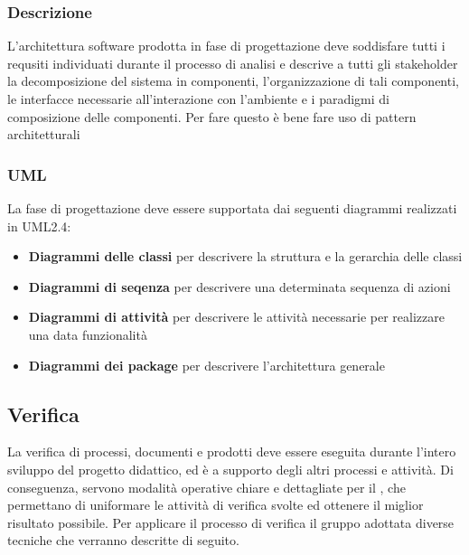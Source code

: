 \documentclass[12pt,a4paper]{article}
\begin{document}
\subsubsection{Descrizione}
L'architettura software prodotta in fase di progettazione deve soddisfare tutti i requsiti individuati durante il processo di analisi e descrive a tutti gli stakeholder la decomposizione del sistema in componenti, l'organizzazione di tali componenti, le interfacce necessarie all'interazione con l'ambiente e i paradigmi di composizione delle componenti. Per fare questo è bene fare uso di pattern architetturali

\subsubsection{UML}
La fase di progettazione deve essere supportata dai seguenti diagrammi realizzati in UML2.4:
\begin{itemize}
	\item \textbf{Diagrammi delle classi} per descrivere la struttura e la gerarchia delle classi
	\item \textbf{Diagrammi di seqenza} per descrivere una determinata sequenza di azioni
	\item \textbf{Diagrammi di attività} per descrivere le attività necessarie per realizzare una data funzionalità
	\item \textbf{Diagrammi dei package} per descrivere l'architettura generale
\end{itemize}

\subsection{Verifica}
La verifica di processi, documenti e prodotti deve essere eseguita durante l'intero sviluppo del progetto didattico, ed è a supporto degli altri processi e attività. Di conseguenza, servono modalità operative chiare e dettagliate per il \VR, che permettano di uniformare le attività di verifica svolte ed ottenere il miglior risultato possibile. Per applicare il processo di verifica il gruppo adottata diverse tecniche che verranno descritte di seguito.
\end{document}
